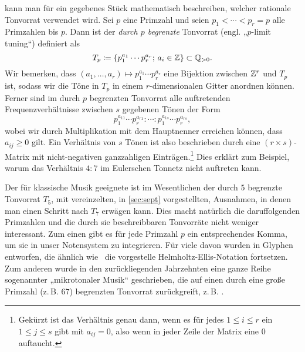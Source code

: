 kann man für ein gegebenes Stück mathematisch beschreiben, welcher rationale
Tonvorrat verwendet wird.  Sei $p$ eine Primzahl und seien $p_1<\dotsb<p_r=p$
alle Primzahlen bis $p$. Dann ist der \emph{durch $p$ begrenzte} Tonvorrat
(engl. „$p$-limit tuning“) definiert als
\[T_p\coloneqq\{p_1^{a_1}\dotsm p_r^{a_r};\,a_i\in\mathbb{Z}\}\subset \mathbb{Q}_{>0}.\]%
Wir bemerken, dass $(a_1,\dotsc,a_r)\mapsto p_1^{a_1}\dotsm p_r^{a_r}$ eine
Bijektion zwischen $\mathbb{Z}^r$ und $T_p$ ist, sodass wir die Töne in $T_p$ in einem
$r$-dimensionalen Gitter anordnen können. Ferner sind im durch $p$ begrenzten
Tonvorrat alle auftretenden Frequenzverhältnisse zwischen $s$ gegebenen Tönen
der Form
\[p_1^{a_{11}}\dotsm p_r^{a_{r1}}:\dotsb:p_1^{a_{1s}}\dotsm p_r^{a_{rs}},\]%
wobei wir durch Multiplikation mit dem Hauptnenner erreichen können, dass
$a_{ij}\ge 0$ gilt. Ein Verhältnis von $s$ Tönen ist also beschrieben durch eine
$(r\times s)$-Matrix mit nicht-negativen ganzzahligen
Einträgen.\footnote{Gekürzt ist das Verhältnis genau dann, wenn es für jedes
	$1\le i\le r$ ein $1\le j\le s$ gibt mit $a_{ij}=0$, also wenn in jeder Zeile
	der Matrix eine $0$ auftaucht.} Dies erklärt zum Beispiel, warum das
Verhältnis $4:7$ im Eulerschen Tonnetz nicht auftreten kann.

Der für klassische Musik geeignete ist im Wesentlichen der durch $5$ begrenzte
Tonvorrat $T_5$, mit vereinzelten, in \cref{sec:sept} vorgestellten, Ausnahmen,
in denen man einen Schritt nach $T_7$ erwägen kann.  Dies macht natürlich die
daruffolgenden Primzahlen und die durch sie beschreibbaren Tonvorräte nicht
weniger interessant. Zum einen gibt es für jede Primzahl $p$ ein entsprechendes
Komma, um sie in unser Notensystem zu integrieren. Für viele davon wurden in
\cite{HEJI} Glyphen entworfen, die ähnlich wie \septimal\ die vorgestelle
Helmholtz-Ellis-Notation fortsetzen. Zum anderen wurde in den zurückliegenden
Jahrzehnten eine ganze Reihe sogenannter „mikrotonaler Musik“ geschrieben, die
auf einen durch eine große Primzahl (z.\,B. $67$) begrenzten Tonvorrat
zurückgreift, z.\,B. \cite{Nicholson}.

 
